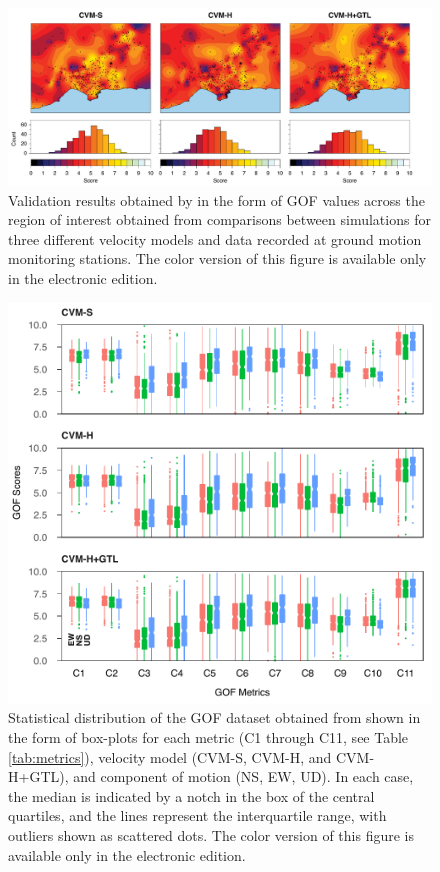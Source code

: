 \begin{figure}[t]
    \centering
    \includegraphics[width=\textwidth]{figures/pdf/figure-02}
    \caption{Validation results obtained by \citet{Taborda_2014_BSSA} in the form of GOF values across the region of interest obtained from comparisons between simulations for three different velocity models and data recorded at ground motion monitoring stations. The color version of this figure is available only in the electronic edition.}
    \label{fig:ref-gof-maps}
\end{figure}
% 
\begin{figure}
    \centering
    \includegraphics[width=\columnwidth]{figures/pdf/figure-03}
    \caption{Statistical distribution of the GOF dataset obtained from \citet{Taborda_2014_BSSA} shown in the form of box-plots for each metric (C1 through C11, see Table \ref{tab:metrics}), velocity model (CVM-S, CVM-H, and CVM-H+GTL), and component of motion (NS, EW, UD). In each case, the median is indicated by a notch in the box of the central quartiles, and the lines represent the interquartile range, with outliers shown as scattered dots. The color version of this figure is available only in the electronic edition.}
    \label{fig:data-box-plot}
\end{figure}

